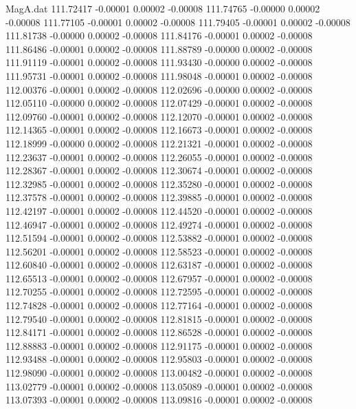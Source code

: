 \begin{filecontents}{MagA.dat}
 111.72417   -0.00001    0.00002   -0.00008
 111.74765   -0.00000    0.00002   -0.00008
 111.77105   -0.00001    0.00002   -0.00008
 111.79405   -0.00001    0.00002   -0.00008
 111.81738   -0.00000    0.00002   -0.00008
 111.84176   -0.00001    0.00002   -0.00008
 111.86486   -0.00001    0.00002   -0.00008
 111.88789   -0.00000    0.00002   -0.00008
 111.91119   -0.00001    0.00002   -0.00008
 111.93430   -0.00000    0.00002   -0.00008
 111.95731   -0.00001    0.00002   -0.00008
 111.98048   -0.00001    0.00002   -0.00008
 112.00376   -0.00001    0.00002   -0.00008
 112.02696   -0.00000    0.00002   -0.00008
 112.05110   -0.00000    0.00002   -0.00008
 112.07429   -0.00001    0.00002   -0.00008
 112.09760   -0.00001    0.00002   -0.00008
 112.12070   -0.00001    0.00002   -0.00008
 112.14365   -0.00001    0.00002   -0.00008
 112.16673   -0.00001    0.00002   -0.00008
 112.18999   -0.00000    0.00002   -0.00008
 112.21321   -0.00001    0.00002   -0.00008
 112.23637   -0.00001    0.00002   -0.00008
 112.26055   -0.00001    0.00002   -0.00008
 112.28367   -0.00001    0.00002   -0.00008
 112.30674   -0.00001    0.00002   -0.00008
 112.32985   -0.00001    0.00002   -0.00008
 112.35280   -0.00001    0.00002   -0.00008
 112.37578   -0.00001    0.00002   -0.00008
 112.39885   -0.00001    0.00002   -0.00008
 112.42197   -0.00001    0.00002   -0.00008
 112.44520   -0.00001    0.00002   -0.00008
 112.46947   -0.00001    0.00002   -0.00008
 112.49274   -0.00001    0.00002   -0.00008
 112.51594   -0.00001    0.00002   -0.00008
 112.53882   -0.00001    0.00002   -0.00008
 112.56201   -0.00001    0.00002   -0.00008
 112.58523   -0.00001    0.00002   -0.00008
 112.60840   -0.00001    0.00002   -0.00008
 112.63187   -0.00001    0.00002   -0.00008
 112.65513   -0.00001    0.00002   -0.00008
 112.67957   -0.00001    0.00002   -0.00008
 112.70255   -0.00001    0.00002   -0.00008
 112.72595   -0.00001    0.00002   -0.00008
 112.74828   -0.00001    0.00002   -0.00008
 112.77164   -0.00001    0.00002   -0.00008
 112.79540   -0.00001    0.00002   -0.00008
 112.81815   -0.00001    0.00002   -0.00008
 112.84171   -0.00001    0.00002   -0.00008
 112.86528   -0.00001    0.00002   -0.00008
 112.88883   -0.00001    0.00002   -0.00008
 112.91175   -0.00001    0.00002   -0.00008
 112.93488   -0.00001    0.00002   -0.00008
 112.95803   -0.00001    0.00002   -0.00008
 112.98090   -0.00001    0.00002   -0.00008
 113.00482   -0.00001    0.00002   -0.00008
 113.02779   -0.00001    0.00002   -0.00008
 113.05089   -0.00001    0.00002   -0.00008
 113.07393   -0.00001    0.00002   -0.00008
 113.09816   -0.00001    0.00002   -0.00008

\end{filecontents}
